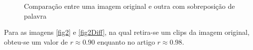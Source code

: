 \documentclass[10pt,a4paper]{article}
\begin{document}
\begin{figure}[h!]
\begin{center}
    \caption{Comparação entre uma imagem original e outra com sobreposição
      de palavra}
  \end{center}
\end{figure}

Para as imagens \ref{fig2} e \ref{fig2Diff}, na qual retira-se um
clips da imagem original, obteu-se um valor de $r\approx 0.90$
enquanto no artigo $r\approx 0.98$.

\begin{figure}[h!]
  \begin{center}
    \hspace{10mm}

\end{center}
\end{figure}
\end{document}
